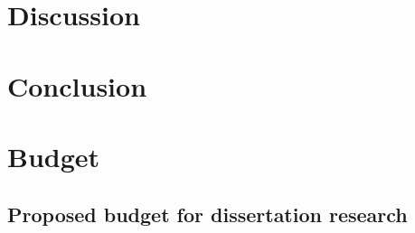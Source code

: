 \documentclass[12pt]{article}
\begin{document}
\newpage
\section{Discussion}
\lipsum[9-10] %



\newpage
\section{Conclusion}
\lipsum[11-12] %

\newpage
\section{Budget}
\subsection{Proposed budget for dissertation research}
\end{document}
